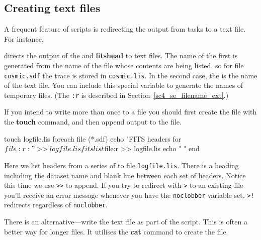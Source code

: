\documentclass[twoside,11pt,nolof]{starlink}
\providecommand{\latexelsehtml}[2]{#1}
\providecommand{\HDSref}{\xref{HDS}{sun92}{}}
\providecommand{\NDFref}[1]{\xref{#1}{sun33}{}}
\begin{document}
\newpage
\subsection{Creating text files
\label{sc4_se_create_textfiles}}

A frequent feature of scripts is redirecting the output from tasks to a
text file.  For instance,

\begin{small}
\end{small}
directs the output of the  and {\bf
fitshead} to text files. The name of the first is generated from the
name of the file whose contents are being listed, so for \textsf{\HDSref}
file \texttt{cosmic.sdf} the trace is stored in \texttt{cosmic.lis}.  In the
second case, the  is the name of the text file.  You can include
this special variable to generate the names of temporary files.  (The
\texttt{:r} is described \latexelsehtml{in
Section~\ref{sc4_se_filename_ext}.)}{\htmlref{here}{sc4_se_filename_ext}.)}

If you intend to write more than once to a file you should first create
the file with the \textbf{touch} command, and then append output to the file.

\begin{small}
\begin{terminalv}
     touch logfile.lis
     foreach file (*.sdf)
        echo "FITS headers for $file:r:"  >> logfile.lis
        fitslist $file:r >> logfile.lis
        echo " "
     end
\end{terminalv}
\end{small}
Here we list  headers from a series of \NDFref{\textsf{NDF}s}
to file \texttt{logfile.lis}.  There is a heading including the dataset
name and blank line between each set of headers.  Notice this time
we use \texttt{>>} to append.  If you try to redirect with \texttt{>}
to an existing file you'll receive an error message whenever you have
the \texttt{noclobber} variable set.  \texttt{>!} redirects regardless
of \texttt{noclobber}.
\bigskip\medskip

There is an alternative---write the text file as part of the script.
This is often a better way for longer files.  It utilises
the \textbf{cat} command to create the file.
\end{document}
